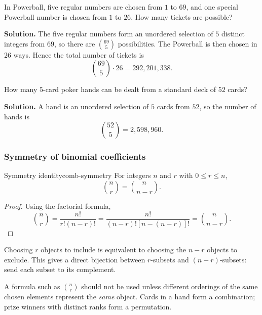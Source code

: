 \begin{examplebox}[title={Powerball}]
In Powerball, five regular numbers are chosen from $1$ to $69$, and one special Powerball number is chosen from $1$ to $26$. How many tickets are possible?

\textbf{Solution.}
The five regular numbers form an unordered selection of $5$ distinct integers from $69$, so there are $\binom{69}{5}$ possibilities. The Powerball is then chosen in $26$ ways. Hence the total number of tickets is
\[
\binom{69}{5}\cdot 26=292{,}201{,}338.
\]
\end{examplebox}

\begin{examplebox}[title={Poker hands}]
How many $5$-card poker hands can be dealt from a standard deck of $52$ cards?

\textbf{Solution.}
A hand is an unordered selection of $5$ cards from $52$, so the number of hands is
\[
\binom{52}{5}=2{,}598{,}960.
\]
\end{examplebox}

\subsubsection{Symmetry of binomial coefficients}

\begin{theorem}{Symmetry identity}{comb-symmetry}
For integers $n$ and $r$ with $0\le r\le n$,
\[
\binom{n}{r}=\binom{n}{n-r}.
\]
\end{theorem}

\begin{proof}
Using the factorial formula,
\[
\binom{n}{r}=\frac{n!}{r!(n-r)!}=\frac{n!}{(n-r)![n-(n-r)]!}=\binom{n}{n-r}.
\]
\end{proof}

\begin{extension}[title={Combinatorial meaning of the symmetry}]
Choosing $r$ objects to include is equivalent to choosing the $n-r$ objects to exclude. This gives a direct bijection between $r$-subsets and $(n-r)$-subsets: send each subset to its complement.
\end{extension}

\begin{commonmistake}[title={Combination formulas are for unordered selections only}]
A formula such as $\binom{n}{r}$ should not be used unless different orderings of the same chosen elements represent the \emph{same} object. Cards in a hand form a combination; prize winners with distinct ranks form a permutation.
\end{commonmistake}

